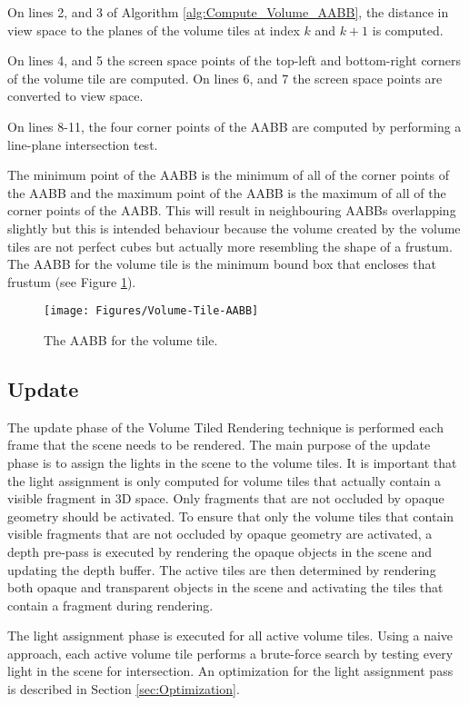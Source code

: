 On lines 2, and 3 of Algorithm \ref{alg:Compute_Volume_AABB}, the distance in view space to the planes of the volume tiles at index $k$ and $k+1$ is computed.

On lines 4, and 5 the screen space points of the top-left and bottom-right corners of the volume tile are computed. On lines 6, and 7 the screen space points are converted to view space.

On lines 8-11, the four corner points of the AABB are computed by performing a line-plane intersection test.

The minimum point of the AABB is the minimum of all of the corner points of the AABB and the maximum point of the AABB is the maximum of all of the corner points of the AABB. This will result in neighbouring AABBs overlapping slightly but this is intended behaviour because the volume created by the volume tiles are not perfect cubes but actually more resembling the shape of a frustum. The AABB for the volume tile is the minimum bound box that encloses that frustum (see Figure \ref{fig:Volume-Tile-AABB}).

\begin{figure}[H]
\centering
\texttt{[image: Figures/Volume-Tile-AABB]}
\decoRule
\caption{The AABB for the volume tile.}
\label{fig:Volume-Tile-AABB}
\end{figure}

\subsection{Update}

The update phase of the Volume Tiled Rendering technique is performed each frame that the scene needs to be rendered. The main purpose of the update phase is to assign the lights in the scene to the volume tiles. It is important that the light assignment is only computed for volume tiles that actually contain a visible fragment in 3D space. Only fragments that are not occluded by opaque geometry should be activated. To ensure that only the volume tiles that contain visible fragments that are not occluded by opaque geometry are activated, a depth pre-pass is executed by rendering the opaque objects in the scene and updating the depth buffer. The active tiles are then determined by rendering both opaque and transparent objects in the scene and activating the tiles that contain a fragment during rendering.

The light assignment phase is executed for all active volume tiles. Using a naive approach, each active volume tile performs a brute-force search by testing every light in the scene for intersection. An optimization for the light assignment pass is described in Section \ref{sec:Optimization}.


